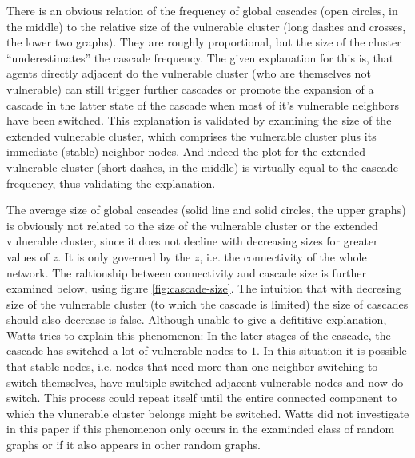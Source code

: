 \documentclass{sig-alternate-05-2015}
\begin{document}
There is an obvious relation of the frequency of global cascades (open circles, in the middle) to the relative size of the vulnerable cluster (long dashes and crosses, the lower two graphs). They are roughly proportional, but the size of the cluster ``underestimates'' the cascade frequency. The given explanation for this is, that agents directly adjacent do the vulnerable cluster (who are themselves not vulnerable) can still trigger further cascades or promote the expansion of a cascade in the latter state of the cascade when most of it's vulnerable neighbors have been switched. This explanation is validated by examining the size of the extended vulnerable cluster, which comprises the vulnerable cluster plus its immediate (stable) neighbor nodes. And indeed the plot for the extended vulnerable cluster (short dashes, in the middle) is virtually equal to the cascade frequency, thus validating the explanation.

The average size of global cascades (solid line and solid circles, the upper graphs) is obviously not related to the size of the vulnerable cluster or the extended vulnerable cluster, since it does not decline with decreasing sizes for greater values of $z$. It is only governed by the $z$, i.e. the connectivity of the whole network. The raltionship between connectivity and cascade size is further examined below, using figure \ref{fig:cascade-size}. The intuition that with decresing size of the vulnerable cluster (to which the cascade is limited) the size of cascades should also decrease is false. Although unable to give a defititive explanation, Watts tries to explain this phenomenon: In the later stages of the cascade, the cascade has switched a lot of vulnerable nodes to $1$. In this situation it is possible that stable nodes, i.e. nodes that need more than one neighbor switching to switch themselves, have multiple switched adjacent vulnerable nodes and now do switch. This process could repeat itself until the entire connected component to which the vlunerable cluster belongs might be switched. Watts did not investigate in this paper if this phenomenon only occurs in the examinded class of random graphs or if it also appears in other random graphs.
\end{document}
